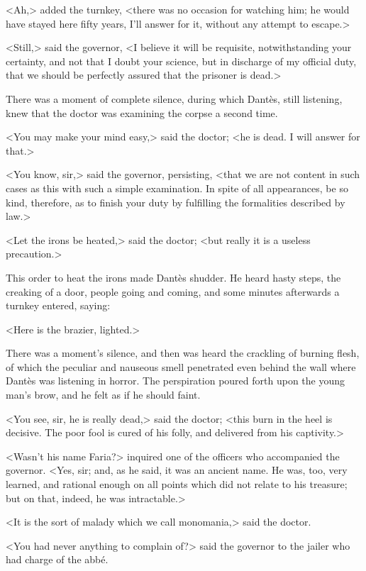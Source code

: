  <Ah,> added the turnkey, <there was no occasion for watching him; he would have stayed here fifty years, I'll answer for it, without any attempt to escape.> 

 <Still,> said the governor, <I believe it will be requisite, notwithstanding your certainty, and not that I doubt your science, but in discharge of my official duty, that we should be perfectly assured that the prisoner is dead.> 

 There was a moment of complete silence, during which Dantès, still listening, knew that the doctor was examining the corpse a second time. 

 <You may make your mind easy,> said the doctor; <he is dead. I will answer for that.> 

 <You know, sir,> said the governor, persisting, <that we are not content in such cases as this with such a simple examination. In spite of all appearances, be so kind, therefore, as to finish your duty by fulfilling the formalities described by law.> 

 <Let the irons be heated,> said the doctor; <but really it is a useless precaution.> 

 This order to heat the irons made Dantès shudder. He heard hasty steps, the creaking of a door, people going and coming, and some minutes afterwards a turnkey entered, saying: 

 <Here is the brazier, lighted.> 

 There was a moment's silence, and then was heard the crackling of burning flesh, of which the peculiar and nauseous smell penetrated even behind the wall where Dantès was listening in horror. The perspiration poured forth upon the young man's brow, and he felt as if he should faint. 

 <You see, sir, he is really dead,> said the doctor; <this burn in the heel is decisive. The poor fool is cured of his folly, and delivered from his captivity.> 

 <Wasn't his name Faria?> inquired one of the officers who accompanied the governor.  <Yes, sir; and, as he said, it was an ancient name. He was, too, very learned, and rational enough on all points which did not relate to his treasure; but on that, indeed, he was intractable.> 

 <It is the sort of malady which we call monomania,> said the doctor. 

 <You had never anything to complain of?> said the governor to the jailer who had charge of the abbé. 

